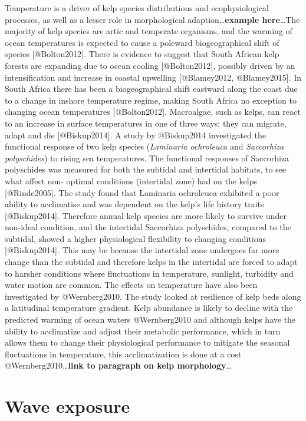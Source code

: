 \documentclass[]{article}
\begin{document}
Temperature is a driver of kelp species distributions and
ecophysiological processes, as well as a lesser role in morphological
adaption\ldots{}\textbf{example here}\ldots{}The majority of kelp
species are artic and temperate organisms, and the warming of ocean
temperatures is expected to cause a poleward biogeographical shift of
species {[}@Bolton2012{]}. There is evidence to suggest that South
African kelp forests are expanding due to ocean cooling
{[}@Bolton2012{]}, possibly driven by an intensiﬁcation and increase in
coastal upwelling {[}@Blamey2012, @Blamey2015{]}. In South Africa there
has been a biogeographical shift eastward along the coast due to a
change in inshore temperature regime, making South Africa no exception
to changing ocean temperatures {[}@Bolton2012{]}. Macroalgae, such as
kelps, can react to an increase in surface temperatures in one of three
ways: they can migrate, adapt and die {[}@Biskup2014{]}. A study by
@Biskup2014 investigated the functional response of two kelp species
(\emph{Laminaria ochroleuca} and \emph{Saccorhiza polyschides}) to
rising sea temperatures. The functional responses of Saccorhiza
polyschides was measured for both the subtidal and intertidal habitats,
to see what aﬀect non- optimal conditions (intertidal zone) had on the
kelps {[}@Rinde2005{]}. The study found that Laminaria ochroleuca
exhibited a poor ability to acclimatise and was dependent on the kelp's
life history traits {[}@Biskup2014{]}. Therefore annual kelp species are
more likely to survive under non-ideal condition, and the intertidal
Saccorhiza polyschides, compared to the subtidal, showed a higher
physiological ﬂexibility to changing conditions {[}@Biskup2014{]}. This
may be because the intertidal zone undergoes far more change than the
subtidal and therefore kelps in the intertidal are forced to adapt to
harsher conditions where ﬂuctuations in temperature, sunlight, turbidity
and water motion are common. The eﬀects on temperature have also been
investigated by @Wernberg2010. The study looked at resilience of kelp
beds along a latitudinal temperature gradient. Kelp abundance is likely
to decline with the predicted warming of ocean waters @Wernberg2010 and
although kelps have the ability to acclimatize and adjust their
metabolic performance, which in turn allows them to change their
physiological performance to mitigate the seasonal ﬂuctuations in
temperature, this acclimatization is done at a cost
@Wernberg2010\ldots{}\textbf{link to paragraph on kelp
morphology}\ldots{}

\section{Wave exposure}\label{wave-exposure}
\end{document}
